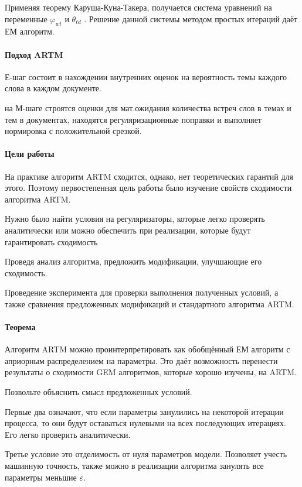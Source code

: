 \documentclass[12pt]{article}
\renewcommand{\phi}{\varphi}
\begin{document}
Применяя теорему Каруша-Куна-Такера, получается система уравнений на переменные  $\phi_{wt}$ и $\theta_{td}$ . Решение данной системы методом простых итераций даёт ЕМ алгоритм.

\paragraph{Подход ARTM}

Е-шаг состоит в нахождении внутренних оценок на вероятность темы каждого слова в каждом документе.

на М-шаге строятся оценки для мат.ожидания количества встреч слов в темах и тем в документах, находятся регуляризационные поправки и выполняет нормировка с положительной срезкой.

\paragraph{Цели работы}
На практике алгоритм ARTM сходится, однако, нет теоретических гарантий для этого. Поэтому первостепенная цель работы было изучение свойств сходимости алгоритма ARTM.

Нужно было найти условия на регуляризаторы, которые легко проверять аналитически или можно обеспечить при реализации, которые будут гарантировать сходимость

Проведя анализ алгоритма, предложить модификации, улучшающие его сходимость.

Проведение эксперимента для проверки выполнения полученных условий, а также сравнения предложенных модификаций и стандартного алгоритма ARTM.

\paragraph{Теорема}
Алгоритм ARTM можно проинтерпретировать как обобщённый ЕМ алгоритм с априорным распределением на параметры. Это даёт возможность перенести результаты о сходимости GEM алгоритмов, которые хорошо изучены, на ARTM.

Позвольте объяснить смысл предложенных условий.

Первые два означают, что если параметры занулились на некоторой итерации процесса, то они будут оставаться нулевыми на всех последующих итерациях. Его легко проверить аналитически.

Третье условие это отделимость от нуля параметров модели. Позволяет учесть машинную точность, также можно в реализации алгоритма занулять все параметры меньшие $\varepsilon$. 
\end{document}
